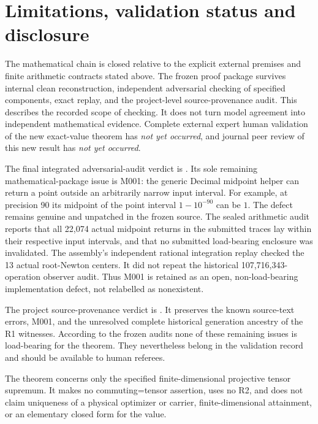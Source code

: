\section{Limitations, validation status and disclosure}\label{sec:validation}
The mathematical chain is closed relative to the explicit external
premises and finite arithmetic contracts stated above. The frozen proof
package survives internal clean reconstruction, independent adversarial
checking of specified components, exact replay, and the project-level
source-provenance audit. This describes the recorded scope of checking.
It does not turn model agreement into independent mathematical evidence.
Complete external expert human validation of the new exact-value theorem has
\emph{not yet occurred}, and journal peer review of this new result has
\emph{not yet occurred}.

The final integrated adversarial-audit verdict is
. Its sole remaining mathematical-package issue is M001:
the generic Decimal midpoint helper can return a point outside an
arbitrarily narrow input interval. For example, at precision 90 its
midpoint of the point interval \(1-10^{-90}\) can be \(1\).
The defect remains genuine and unpatched in the frozen source.
The sealed arithmetic audit reports that all 22,074 actual midpoint
returns in the submitted traces lay within their respective input
intervals, and that no submitted load-bearing enclosure was invalidated.
The assembly's independent rational integration replay checked the 13
actual root-Newton centers. It did not repeat the historical
107,716,343-operation observer audit. Thus M001 is retained as an open,
non-load-bearing implementation defect, not relabelled as nonexistent.

The project source-provenance verdict is
. It preserves the known source-text
errors, M001, and the unresolved complete historical generation ancestry
of the R1 witnesses. According to the frozen audits none of these
remaining issues is load-bearing for the theorem. They nevertheless
belong in the validation record and should be available to human referees.

The theorem concerns only the specified finite-dimensional projective
tensor supremum. It makes no commuting=tensor assertion, uses no R2,
and does not claim uniqueness of a physical optimizer or carrier,
finite-dimensional attainment, or an elementary closed form for the value.

